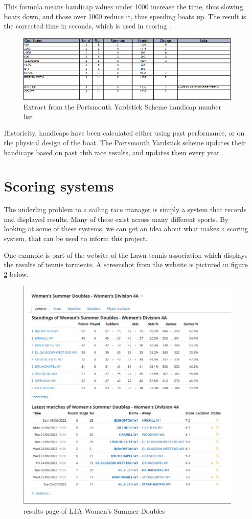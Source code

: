 \documentclass{l4proj}
\begin{document}
This formula means handicap values under 1000 increase the time, thus slowing boats down, and those over 1000 reduce it, thus speeding boats up. The result is the corrected time in seconds, which is used in scoring \citep{RYAscore}.

\begin{figure}[h!]
    \centering
    \includegraphics[width=0.6\linewidth]{images/Handicaps.png} 

    \caption{Extract from the Portsmouth Yardstick Scheme handicap number list \citep{RYApy}
    }

    \label{fig:Hanicaps} 
\end{figure}

Historicity, handicaps have been calculated either using past performance, or on the physical design of the boat. The Portsmouth Yardstick scheme updates their handicaps based on past club race results, and updates them every year \citep{hanicaps}.

\section{Scoring systems}
The underling problem to a sailing race manager is simply a system that records and displayed results. Many of these exist across many different sports. By looking at some of these systems, we can get an idea about what makes a scoring system, that can be used to inform this project.

One example is part of the website of the Lawn tennis association \citet{Tennis} which displays the results of tennis torments. A screenshot from the website is pictured in figure \ref{fig:Tennis} below.

\begin{figure}[h!]
    \centering
    \includegraphics[width=0.6\linewidth]{images/Tennis systme.png} 

    \caption{results page of LTA Women's Summer Doubles \citep{Tennis}
    }

    \label{fig:Tennis} 
\end{figure}
\end{document}
